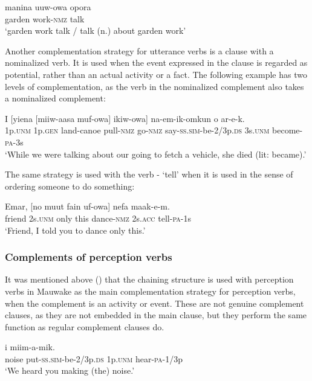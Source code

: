 \ea%
\label{ex:x1598}
\gll manina  uuw-owa  opora \\
garden  work-\textsc{nmz} talk\\
\glt`garden work talk / talk (n.) about garden work'
\z


Another complementation strategy for utterance verbs is a clause with a nominalized verb. It is used when the event expressed in the clause is regarded as potential, rather than an actual activity or a fact. The following example has two levels of complementation, as the verb in the nominalized complement also takes a nominalized complement:

\ea%
\label{ex:x1599}
\gll I  [yiena  [miiw-aasa  muf-owa]  ikiw-owa] na-em-ik-omkun  o  ar-e-k. \\
1p.\textsc{unm} 1p.\textsc{gen} land-canoe pull-\textsc{nmz} go-\textsc{nmz} say-\textsc{ss}.\textsc{sim}-be-2/3p.\textsc{ds} 3s.\textsc{unm} become-\textsc{pa}-3s\\
\glt`While we were talking about our going to fetch a vehicle, she died (lit: became).'
\z


The same strategy is used with the verb - `tell' when it is used in the sense of ordering someone to do something: 

\ea%
\label{ex:x1630}
\gll Emar,  [no  muut  fain  uf-owa]  nefa  maak-e-m.\\
friend  2s.\textsc{unm} only  this  dance-\textsc{nmz} 2s.\textsc{acc} tell-\textsc{pa}-1s\\
\glt`Friend, I told you to dance only this.'
\z


\subsubsection[Complements of perception verbs]{Complements of perception verbs}

It was mentioned above () that the chaining structure is used with perception verbs in Mauwake as the main complementation strategy for perception verbs, when the complement is an activity or event. These are not genuine complement clauses, as they are not embedded in the main clause, but they perform the same function as regular complement clauses do. 

\ea%
\label{ex:x1512}
  i  miim-a-mik.\\
noise  put-\textsc{ss}.\textsc{sim}-be-2/3p.\textsc{ds} 1p.\textsc{unm}  hear-\textsc{pa}-1/3p\\
\glt`We heard you making (the) noise.'
\z


